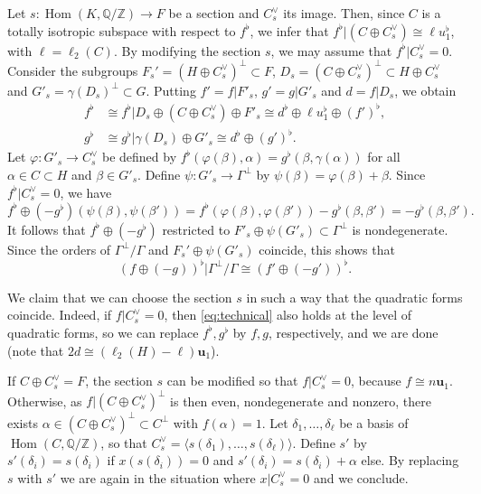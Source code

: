 \documentclass[a4paper]{amsart}
\theoremstyle{definition}
\theoremstyle{plain}
\DeclareMathOperator{\Hom}{Hom}
\newcommand{\IQ}{\mathbb{Q}}
\newcommand{\IZ}{\mathbb{Z}}
\newcommand{\bu}{\mathbf{u}}
\begin{document}
Let \(s\colon \Hom(K,\IQ/\IZ) \rightarrow F\) be a section and \(C^\vee_s\) its image. 
Then, since \(C\) is a totally isotropic subspace with respect to \(f^\flat\), we infer that \(f^\flat|(C \oplus C_s^\vee) \cong \ell u_1^\flat\), with \(\ell = \ell_2(C)\).
By modifying the section \(s\), we may assume that \(f^\flat|C_s^\vee = 0\).
Consider the subgroups \(F_s' = (H \oplus C_s^\vee)^\perp \subset F\), \(D_s = (C \oplus C^\vee_s)^{\perp} \subset H\oplus C^\vee_s\) and \(G'_s = \gamma(D_s)^\perp \subset G\).
Putting \(f' = f|F'_s\), \(g' = g|G'_s\) and \(d = f|D_s\), we obtain
\begin{align*} 
 f^\flat &\cong f^\flat|D_s \oplus (C\oplus C_s^\vee) \oplus F'_s \cong d^\flat \oplus \ell u_1^\flat \oplus (f')^\flat, \\
 g^\flat & \cong g^\flat|\gamma(D_s) \oplus G'_s \cong d^\flat \oplus (g')^\flat.
\end{align*}
Let \(\varphi\colon G'_s \rightarrow C_s^\vee\) be defined by
\(f^\flat(\varphi(\beta), \alpha) = g^\flat(\beta, \gamma(\alpha))\)
for all \(\alpha \in C\subset H\) and \(\beta \in G'_s\).
Define \(\psi\colon G'_s \rightarrow \Gamma^\perp\) by \(\psi(\beta) = \varphi(\beta) + \beta\).
Since \(f^\flat|C^\vee_s = 0\), we have
\begin{equation} \label{eq:technical}
 f^\flat \oplus (-g^\flat)(\psi(\beta),\psi(\beta')) = f^\flat(\varphi(\beta),\varphi(\beta')) - g^\flat(\beta,\beta') = -g^\flat(\beta,\beta'). 
\end{equation}
It follows that \(f^\flat \oplus (-g^\flat)\) restricted to \(F'_s \oplus \psi(G'_s) \subset \Gamma^\perp\) is nondegenerate. Since the orders of \(\Gamma^\perp/\Gamma\) and \(F_s' \oplus \psi(G'_s)\) coincide, this shows that
\[
 (f \oplus (-g))^\flat|\Gamma^\perp/\Gamma \cong (f' \oplus (-g'))^\flat.
\]

We claim that we can choose the section \(s\) in such a way that the quadratic forms coincide.
Indeed, if \(f|C^\vee_s = 0\), then \eqref{eq:technical} also holds at the level of quadratic forms, so we can replace \(f^\flat,g^\flat\) by \(f,g\), respectively, and we are done (note that \(2d \cong (\ell_2(H)-\ell)\bu_1\)).

If \(C \oplus C_s^\vee = F\), the section \(s\) can be modified so that \(f|C_s^\vee = 0\), because \(f \cong n\bu_1\).
Otherwise, as \(f|(C\oplus C_s^\vee)^\perp\) is then even, nondegenerate and nonzero, 
there exists \(\alpha \in (C \oplus C_s^\vee)^\perp\subset C^\perp\) with \(f(\alpha) = 1\). 
Let \(\delta_1,\ldots,\delta_\ell\) be a basis of \(\Hom(C,\IQ/\IZ)\), 
so that \(C_s^\vee = \langle s(\delta_1),\ldots,s(\delta_\ell)\rangle\).
Define \(s'\) by \(s'(\delta_i) = s(\delta_i)\) if \(x(s(\delta_i)) = 0\) and \(s'(\delta_i) = s(\delta_i) + \alpha\) else.
By replacing \(s\) with \(s'\) we are again in the situation where \(x|C_s^\vee = 0\) and we conclude.
\endproof 
\end{document}
